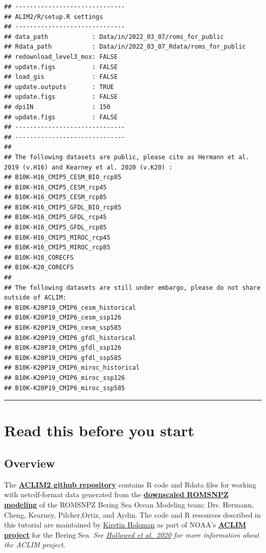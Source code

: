 \documentclass[
]{article}
\begin{document}
\begin{verbatim}
## ------------------------------
## ALIM2/R/setup.R settings 
## ------------------------------
## data_path            : Data/in/2022_03_07/roms_for_public 
## Rdata_path           : Data/in/2022_03_07_Rdata/roms_for_public 
## redownload_level3_mox: FALSE 
## update.figs          : FALSE 
## load_gis             : FALSE 
## update.outputs       : TRUE 
## update.figs          : FALSE 
## dpiIN                : 150 
## update.figs          : FALSE 
## ------------------------------
## ------------------------------
## 
## The following datasets are public, please cite as Hermann et al. 2019 (v.H16) and Kearney et al. 2020 (v.K20) :
## B10K-H16_CMIP5_CESM_BIO_rcp85 
## B10K-H16_CMIP5_CESM_rcp45 
## B10K-H16_CMIP5_CESM_rcp85 
## B10K-H16_CMIP5_GFDL_BIO_rcp85 
## B10K-H16_CMIP5_GFDL_rcp45 
## B10K-H16_CMIP5_GFDL_rcp85 
## B10K-H16_CMIP5_MIROC_rcp45 
## B10K-H16_CMIP5_MIROC_rcp85 
## B10K-H16_CORECFS 
## B10K-K20_CORECFS 
## 
## The following datasets are still under embargo, please do not share outside of ACLIM:
## B10K-K20P19_CMIP6_cesm_historical 
## B10K-K20P19_CMIP6_cesm_ssp126 
## B10K-K20P19_CMIP6_cesm_ssp585 
## B10K-K20P19_CMIP6_gfdl_historical 
## B10K-K20P19_CMIP6_gfdl_ssp126 
## B10K-K20P19_CMIP6_gfdl_ssp585 
## B10K-K20P19_CMIP6_miroc_historical 
## B10K-K20P19_CMIP6_miroc_ssp126 
## B10K-K20P19_CMIP6_miroc_ssp585
\end{verbatim}

\begin{center}\rule{0.5\linewidth}{0.5pt}\end{center}

\hypertarget{read-this-before-you-start}{%
\section{Read this before you start}\label{read-this-before-you-start}}

\hypertarget{overview}{%
\subsection{Overview}\label{overview}}

The \href{https://github.com/kholsman/ACLIM2}{\textbf{ACLIM2 github
repository}} contains R code and Rdata files for working with
netcdf-format data generated from the
\href{https://beringnpz.github.io/roms-bering-sea}{\textbf{downscaled
ROMSNPZ modeling}} of the ROMSNPZ Bering Sea Ocean Modeling team; Drs.
Hermann, Cheng, Kearney, Pilcher,Ortiz, and Aydin. The code and R
resources described in this tutorial are maintained by
\href{mailto:kirstin.holsman@noaa.gov}{Kirstin Holsman} as part of
NOAA's
\href{https://www.fisheries.noaa.gov/alaska/ecosystems/alaska-climate-integrated-modeling-project}{\textbf{ACLIM
project}} for the Bering Sea. \emph{See
\href{https://www.frontiersin.org/articles/10.3389/fmars.2019.00775/full}{Hollowed
et al.~2020} for more information about the ACLIM project.}
\end{document}

